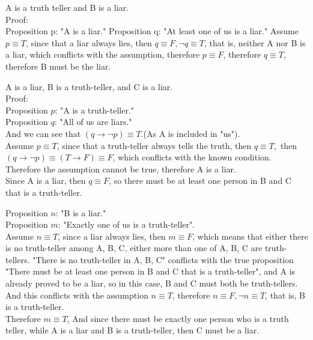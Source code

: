 \documentclass[12pt]{exam}
\begin{document}
\begin{solution}
\begin{qparts}
    \item 
A is a truth teller and B is a liar.\\
Proof: \\
Proposition p: "A is a liar."
Proposition q: "At least one of us is a liar."
Assume $p \equiv T$, since that a liar always lies, then $q \equiv F, \lnot q \equiv T$, that is, neither A nor B is a liar, which conflicts with the assumption, therefore $p \equiv F$, therefore $q\equiv T$, therefore B must be the liar.
    \item 
A is a liar, B is a truth-teller, and C is a liar.\\
Proof:\\
    Proposition $p$: "A is a truth-teller." \\
    Proposition $q$: "All of us are liars."\\
And we can see that $(q \rightarrow \lnot p) \equiv T$.(As A is included in "us"). \\
Assume $p \equiv T$, since that a truth-teller always tells the truth, then $q \equiv T,$  then $(q \rightarrow \lnot p)\equiv (T \rightarrow F) \equiv F$, which conflicts with the known condition. Therefore the assumption cannot be true, therefore A is a liar. \\
Since A is a liar, then $q \equiv F$, so there must be at least one person in B and C that is a truth-teller.

Proposition $n$: "B is a liar." \\
Proposition $m$: "Exactly one of us is a truth-teller".\\
Assume $n\equiv T$, since a liar always lies, then $m \equiv F$, which means that either there is no truth-teller among A, B, C, either more than one of A, B, C are truth-tellers.
"There is no truth-teller in A, B, C" conflicts with the true proposition "There must be at least one person in B and C that is a truth-teller", and A is already proved to be a liar, so in this case, B and C must both be truth-tellers. And this conflicts with the assumption $n\equiv T$, therefore $n \equiv F, \lnot n \equiv T$, that is, B is a truth-teller. \\

Therefore $m \equiv T$, 
And since there must be exactly one person who is a truth teller, while A is a liar and B is a truth-teller, then C must be a liar.
\end{qparts}
\end{solution}
\end{document}
